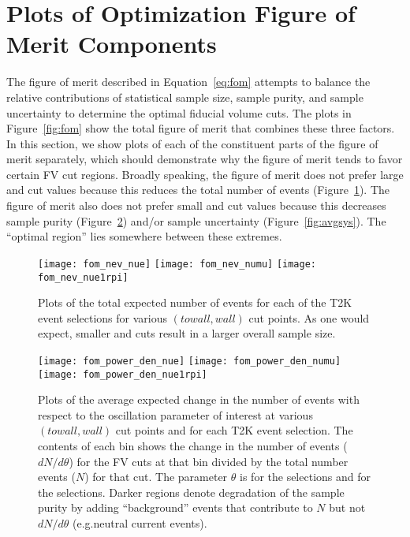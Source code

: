 \section{Plots of Optimization Figure of Merit Components}
\label{sec:fomplots}

The figure of merit described in Equation~\ref{eq:fom} attempts to balance the
relative contributions of statistical sample size, sample purity, and sample
uncertainty to determine the optimal fiducial volume cuts. The plots in
Figure~\ref{fig:fom} show the total figure of merit that combines these three
factors.  In this section, we show plots of each of the constituent parts of
the figure of merit separately, which should demonstrate why the figure of
merit tends to favor certain FV cut regions.  Broadly speaking, the figure of
merit does not prefer large \towall and \wall cut values because this reduces
the total number of events (Figure~\ref{fig:nev}).  The figure of merit also
does not prefer small \towall and \wall cut values because this decreases
sample purity (Figure~\ref{fig:avgpow}) and/or sample uncertainty
(Figure~\ref{fig:avgsys}).  The ``optimal region'' lies somewhere between these
extremes.

\begin{figure}[h]
  \begin{center}
    \texttt{[image: fom\_nev\_nue]}
    \texttt{[image: fom\_nev\_numu]}
    \texttt{[image: fom\_nev\_nue1rpi]}
  \end{center}
  \caption{Plots of the total expected number of events for each of the T2K
  event selections for various $(towall,wall)$ cut points.  As one would expect, smaller
  \towall and \wall cuts result in a larger overall sample size.}
  \label{fig:nev}
\end{figure}


\begin{figure}[h]
  \begin{center}
    \texttt{[image: fom\_power\_den\_nue]}
    \texttt{[image: fom\_power\_den\_numu]}
    \texttt{[image: fom\_power\_den\_nue1rpi]}
  \end{center}
  \caption{Plots of the average expected change in the number of events with
  respect to the oscillation parameter of interest at various $(towall,wall)$
  cut points and for each T2K event selection.  The contents of each bin shows
  the change in the number of events ($dN/d\theta$) for the FV cuts at that bin
  divided by the total number events ($N$) for that cut. The parameter $\theta$
  is \dcp for the \nue selections and \thdis for the \numu selections.  Darker
  regions denote degradation of the sample purity by adding ``background''
  events that contribute to $N$ but not $dN/d\theta$ (e.g.\@ neutral current
  events).}
  \label{fig:avgpow}
\end{figure}


